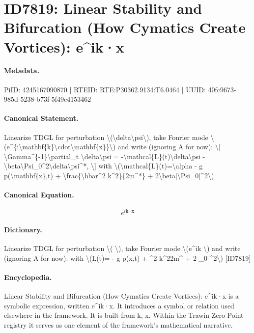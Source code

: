\section*{ID7819: Linear Stability and Bifurcation (How Cymatics Create Vortices): e\textasciicircum{}ik·x}
\paragraph{Metadata.}
PiID: 4245167090870 | RTEID: RTE:P30362.9134:T6.0464 | UUID: 40fc9673-985d-5238-b73f-5f49c4153462

\paragraph{Canonical Statement.}
Linearize TDGL for perturbation \textbackslash{}(\textbackslash{}delta\textbackslash{}psi\textbackslash{}), take Fourier mode \textbackslash{}(e\textasciicircum{}\{i\textbackslash{}mathbf\{k\}\textbackslash{}cdot\textbackslash{}mathbf\{x\}\}\textbackslash{}) and write (ignoring A for now): \textbackslash{}[ \textbackslash{}Gamma\textasciicircum{}\{-1\}\textbackslash{}partial\_t \textbackslash{}delta\textbackslash{}psi = -\textbackslash{}mathcal\{L\}(t)\textbackslash{}delta\textbackslash{}psi - \textbackslash{}beta\textbackslash{}Psi\_0\textasciicircum{}2\textbackslash{}delta\textbackslash{}psi\textasciicircum{}*, \textbackslash{}] with \textbackslash{}(\textbackslash{}mathcal\{L\}(t)=\textbackslash{}alpha - g p(\textbackslash{}mathbf\{x\},t) + \textbackslash{}frac\{\textbackslash{}hbar\textasciicircum{}2 k\textasciicircum{}2\}\{2m\textasciicircum{}*\} + 2\textbackslash{}beta|\textbackslash{}Psi\_0|\textasciicircum{}2\textbackslash{}).

\paragraph{Canonical Equation.}
\[
e^{i\mathbf{k}\cdot\mathbf{x}}
\]

\paragraph{Dictionary.}
Linearize TDGL for perturbation \textbackslash{}( \textbackslash{}), take Fourier mode \textbackslash{}(e\textasciicircum{}ik \textbackslash{}) and write (ignoring A for now): with \textbackslash{}(L(t)= - g p(x,t) + \textasciicircum{}2 k\textasciicircum{}22m\textasciicircum{} + 2 \_0 \textasciicircum{}2\textbackslash{}) [ID7819]

\paragraph{Encyclopedia.}
Linear Stability and Bifurcation (How Cymatics Create Vortices): e\textasciicircum{}ik·x is a symbolic expression, written e\textasciicircum{}ik·x. It introduces a symbol or relation used elsewhere in the framework. It is built from k, x. Within the Trawin Zero Point registry it serves as one element of the framework's mathematical narrative.
